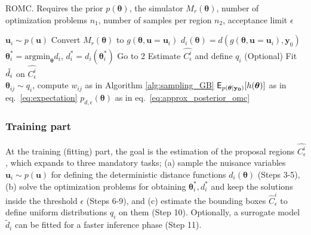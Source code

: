 \documentclass[article]{jss}
\newcommand{\ub}{\mathbf{u}}
\newcommand{\yb}{\mathbf{y}}
\newcommand{\thetab}{\boldsymbol{\theta}}
\newcommand{\data}{\mathbf{y_0}}
\newcommand{\accregioni}{C^i_{\epsilon}}
\newcommand{\accregionihat}{\hat{C}^i_{\epsilon}}
\begin{document}
\begin{algorithm}[!ht]
  \caption{ROMC. Requires the prior \( p(\thetab) \), the simulator
    \(M_r(\thetab)\), number of optimization problems \(n_1\), number
    of samples per region \(n_2\), acceptance limit
    \(\epsilon\)}\label{alg:romc_algorithm}
  \begin{algorithmic}[1]
    \State \(\ub_i \sim p(\ub)\) 
    \State Convert \(M_r(\thetab) \) to \( g(\thetab, \ub=\ub_i) \) 
      \State \( d_i(\thetab) = d(g(\thetab, \ub=\ub_i), \yb_0) \) 
      \State \(\thetab_i^* = \text{argmin}_{\thetab} d_i\), \(d_i^*=d_i(\thetab_i^*)\) 
        \State Go to 2 
      \EndIf
      \State Estimate \(\hat{\accregioni}\) and define \(q_i\) 
      \State (Optional) Fit \(\Tilde{d}_i\) on \(\hat{\accregioni}\) 
      \\\hrulefill
      \State \(\thetab_{ij} \sim q_i\), compute \(w_{ij}\) as in Algorithm \ref{alg:sampling_GB} 
      \EndFor
    \EndFor
    \State \(\E_{p(\thetab|\data)}[h(\thetab)]\) as in eq.~\eqref{eq:expectation} 
    \State \(p_{d,\epsilon}(\thetab) \) as in eq.~\eqref{eq:approx_posterior_omc} 
    \EndProcedure
  \end{algorithmic}
\end{algorithm}

\subsubsection*{Training part}
\noindent
At the training (fitting) part, the goal is the estimation of the
proposal regions \(\hat{\accregioni}\), which expands to three
mandatory tasks; (a) sample the nuisance variables
\(\ub_i \sim p(\ub)\) for defining the deterministic distance
functions \(d_i(\thetab)\) (Steps 3-5), (b) solve the optimization
problems for obtaining \(\thetab_i^*, d_i^*\) and keep the solutions
inside the threshold \(\epsilon\) (Steps 6-9), and (c) estimate the
bounding boxes \(\accregionihat\) to define uniform distributions
\(q_i\) on them (Step 10). Optionally, a surrogate model
\(\tilde{d}_i\) can be fitted for a faster inference phase (Step 11).
\end{document}
